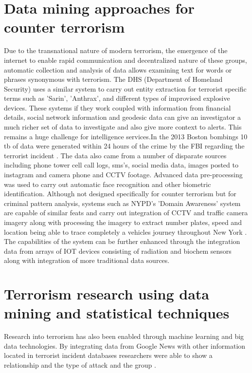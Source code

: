 \section{Data mining approaches for counter terrorism}

Due to the transnational nature of  modern terrorism, the emergence of the internet to enable rapid communication and decentralized nature of these groups, automatic collection and analysis of data allows examining text for words or phrases synonymous with terrorism.  The DHS (Department of Homeland Security) uses a similar system to carry out entity extraction for terrorist specific terms such as 'Sarin', 'Anthrax', and different types of improvised explosive devices. These systems if they work coupled with information from financial details, social network information and geodesic data can give an investigator a much richer set of data to investigate and also give more context to alerts. This remains a huge challenge for intelligence services.In the 2013 Boston bombings 10 tb of data were generated within 24 hours of the crime by the FBI regarding the terrorist incident \citep{jeberson2015survey}. The data also came from a number of disparate sources including phone tower cell call logs, sms's, social media data, images posted to instagram and camera phone and CCTV footage. Advanced data pre-processing was used to carry out automatic face recognition and other biometric identification. Although not designed specifically for counter terrorism but for criminal pattern analysis, systems such as NYPD's 'Domain Awareness' system are capable of similar feats and carry out integration of CCTV and traffic camera imagery along with processing the imagery to extract number plates, speed and location being able to trace completely a vehicles journey throughout New York \citep{coscarelli2012nypd}. The capabilities of the system can be further enhanced through the integration data from arrays of IOT devices consisting of radiation and biochem sensors along with integration of more traditional data sources.

\section{Terrorism research using data mining and statistical techniques}
Research into terrorism has also been enabled through machine learning and big data technologies. By integrating data from Google News with other information located in terrorist incident databases researchers were able to show a relationship and the type of attack and the group \citep{strang2015analyzing}.

